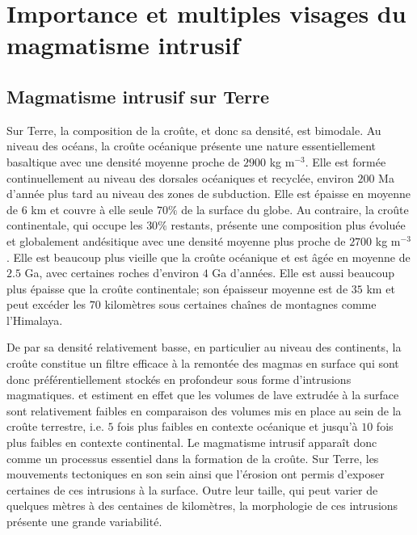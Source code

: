 \section{Importance et multiples visages du magmatisme intrusif}
\label{C1-sec:zool-des-intr}

\subsection{Magmatisme intrusif sur Terre}
\label{C1-sec:definition}

Sur  Terre, la  composition  de la  croûte, et  donc  sa densité,  est
bimodale.   Au niveau  des océans,  la croûte  océanique présente  une
nature essentiellement  basaltique avec une densité  moyenne proche de
$2900$ kg  m$^{-3}$.  Elle  est formée  continuellement au  niveau des
dorsales océaniques et recyclée, environ $200$ Ma d'année plus tard au
niveau des zones de subduction. Elle  est épaisse en moyenne de $6$ km
et couvre à elle seule $70\%$ de la surface du globe. Au contraire, la
croûte  continentale, qui  occupe  les $30\%$  restants, présente  une
composition plus  évoluée et globalement andésitique  avec une densité
moyenne plus  proche de  $2700$ kg m$^{-3}$.   Elle est  beaucoup plus
vieille que  la croûte océanique et  est âgée en moyenne  de $2.5$ Ga,
avec  certaines  roches d'environ  $4$  Ga  d'années. Elle  est  aussi
beaucoup  plus  épaisse  que  la croûte  continentale;  son  épaisseur
moyenne  est de  $35$  km et  peut excéder  les  $70$ kilomètres  sous
certaines chaînes de montagnes comme l'Himalaya.

De par  sa densité  relativement basse, en  particulier au  niveau des
continents, la croûte  constitue un filtre efficace à  la remontée des
magmas  en  surface  qui   sont  donc  préférentiellement  stockés  en
profondeur sous forme  d'intrusions magmatiques.  \citet{Crisp:1984dm}
et  \citet{White:2006gr} estiment  en effet  que les  volumes de  lave
extrudée à  la surface  sont relativement  faibles en  comparaison des
volumes mis  en place au sein  de la croûte terrestre,  i.e.  $5$ fois
plus faibles en  contexte océanique et jusqu'à $10$  fois plus faibles
en contexte  continental.  Le magmatisme intrusif  apparaît donc comme
un processus essentiel dans la formation de la croûte.  Sur Terre, les
mouvements  tectoniques en  son sein  ainsi que  l'érosion ont  permis
d'exposer  certaines  de ces  intrusions  à  la surface.   Outre  leur
taille,  qui  peut  varier  de  quelques mètres  à  des  centaines  de
kilomètres,  la  morphologie de  ces  intrusions  présente une  grande
variabilité.

